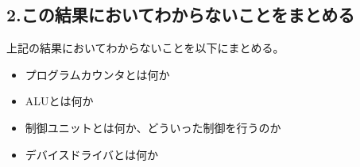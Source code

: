 \documentclass[a4paper,11pt,titlepage,dvipdfmx]{jsarticle}
\begin{document}
\subsection*{2.この結果においてわからないことをまとめる}
上記の結果においてわからないことを以下にまとめる。
\begin{itemize}
    \item プログラムカウンタとは何か
    \item ALUとは何か
    \item 制御ユニットとは何か、どういった制御を行うのか
    \item デバイスドライバとは何か
\end{itemize}
\end{document}
